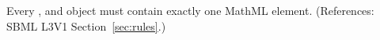 Every \AssignmentRule, \RateRule and \AlgebraicRule object must contain
exactly one MathML  element.  (References: SBML L3V1
Section~\ref{sec:rules}.)

